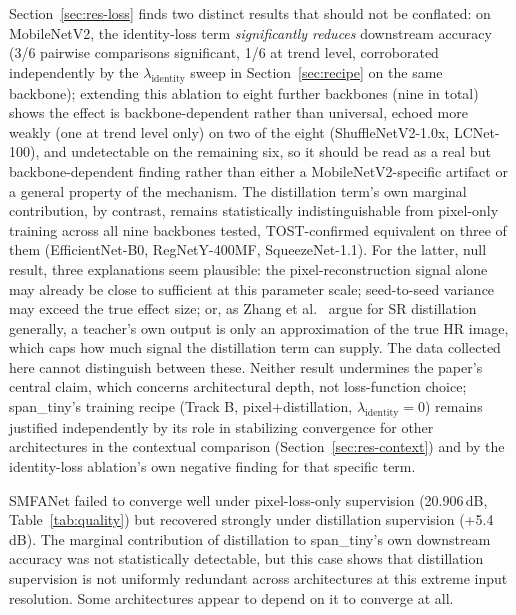 \documentclass[11pt]{article}
\begin{document}
Section~\ref{sec:res-loss} finds two distinct results that should not be conflated: on MobileNetV2, the identity-loss term \emph{significantly reduces} downstream accuracy (3/6 pairwise comparisons significant, 1/6 at trend level, corroborated independently by the $\lambda_{\text{identity}}$ sweep in Section~\ref{sec:recipe} on the same backbone); extending this ablation to eight further backbones (nine in total) shows the effect is backbone-dependent rather than universal, echoed more weakly (one at trend level only) on two of the eight (ShuffleNetV2-1.0x, LCNet-100), and undetectable on the remaining six, so it should be read as a real but backbone-dependent finding rather than either a MobileNetV2-specific artifact or a general property of the mechanism. The distillation term's own marginal contribution, by contrast, remains statistically indistinguishable from pixel-only training across all nine backbones tested, TOST-confirmed equivalent on three of them (EfficientNet-B0, RegNetY-400MF, SqueezeNet-1.1). For the latter, null result, three explanations seem plausible: the pixel-reconstruction signal alone may already be close to sufficient at this parameter scale; seed-to-seed variance may exceed the true effect size; or, as Zhang et al.~\cite{zhang2024dukd} argue for SR distillation generally, a teacher's own output is only an approximation of the true HR image, which caps how much signal the distillation term can supply. The data collected here cannot distinguish between these. Neither result undermines the paper's central claim, which concerns architectural depth, not loss-function choice; span\_tiny's training recipe (Track B, pixel+distillation, $\lambda_{\text{identity}}{=}0$) remains justified independently by its role in stabilizing convergence for other architectures in the contextual comparison (Section~\ref{sec:res-context}) and by the identity-loss ablation's own negative finding for that specific term.

SMFANet failed to converge well under pixel-loss-only supervision (20.906\,dB, Table~\ref{tab:quality}) but recovered strongly under distillation supervision (+5.4\,dB). The marginal contribution of distillation to span\_tiny's own downstream accuracy was not statistically detectable, but this case shows that distillation supervision is not uniformly redundant across architectures at this extreme input resolution. Some architectures appear to depend on it to converge at all.
\end{document}
